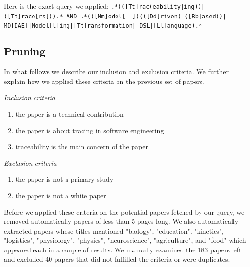 
Here is the exact query we applied:
	\texttt{.*(([Tt]rac(eability|ing))|([Tt]race[rs])).* AND
	.*(([Mm]odel[- ])(([Dd]riven)|([Bb]ased))| 
	MD[DAE]|Model[l]ing|[Tt]ransformation| DSL|[Ll]anguage).*}


\subsection{Pruning}
In what follows we describe our inclusion and exclusion criteria. We further explain how we applied these criteria on the previous set of papers. 

\textit{Inclusion criteria}
\begin{enumerate}
	\item the paper is a technical contribution 
	\item the paper is about tracing in software engineering
	\item traceability is the main concern of the paper
\end{enumerate}

\textit{Exclusion criteria}
\begin{enumerate}
	\item the paper is not a primary study
	\item the paper is not a white paper
\end{enumerate}

Before we applied these criteria on the potential papers fetched by our query, we removed automatically papers of less than 5 pages long.
We also automatically extracted papers whose titles mentioned "biology", "education", "kinetics", "logistics", "physiology", "physics", "neuroscience", "agriculture", and "food" which appeared each in a couple of results.  We manually examined the 183 papers left and excluded 40 papers that did not fulfilled the criteria or were duplicates.

